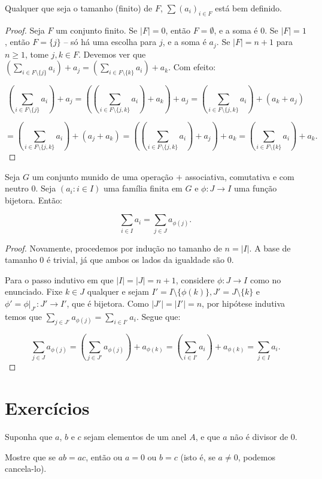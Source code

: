 \begin{lemma}
Qualquer que seja o tamanho (finito) de $F$, $\sum(a_i)_{i\in F}$ está bem definido.
\end{lemma}

\begin{proof}
    Seja $F$ um conjunto finito.
Se $|F|=0$, então $F=\emptyset$, e a soma é $0$.
Se $|F|=1$, então $F=\{j\}$ -- só há uma escolha para $j$, e a soma é $a_j$.
    Se $|F|=n+1$ para $n\geq 1$, tome $j, k \in F$.
    Devemos ver que $\left(\sum_{i\in F\setminus\{j\}} a_i\right)+a_j=\left(\sum_{i\in F\setminus\{k\}} a_i\right)+a_k$.
    Com efeito:

    \[\left(\sum_{i\in F\setminus\{j\}} a_i\right)+a_j=\left(\left(\sum_{i\in F\setminus\{j, k\}} a_i\right)+a_k\right)+a_j=\left(\sum_{i\in F\setminus\{j, k\}} a_i\right)+(a_k+a_j)\]

    \[=\left(\sum_{i\in F\setminus\{j, k\}} a_i\right)+(a_j+a_k)=\left(\left(\sum_{i\in F\setminus\{j, k\}} a_i\right)+a_j\right)+a_k=\left(\sum_{i\in F\setminus\{k\}} a_i\right)+a_k.\]
\end{proof}

\begin{prop}
    Seja $G$ um conjunto munido de uma operação $+$ associativa, comutativa e com neutro $0$.
Seja $(a_i: i \in I)$ uma família finita em $G$ e $\phi:J\rightarrow I$ uma função bijetora.
Então:

    \[\sum_{i \in I}a_i=\sum_{j \in J}a_{\phi(j)}.\]

\end{prop}
\begin{proof}
Novamente, procedemos por indução no tamanho de $n=|I|$.
A base de tamanho $0$ é trivial, já que ambos os lados da igualdade são $0$.

Para o passo indutivo em que $|I|=|J|=n+1$, considere $\phi:J\rightarrow I$ como no enunciado.
Fixe $k \in J$ qualquer e sejam $I'=I\setminus\{\phi(k)\}, J'=J\setminus\{k\}$ e $\phi'=\phi|_{J'}:J'\rightarrow I'$, que é bijetora.
Como $|J'|=|I'|=n$, por hipótese indutiva temos que $\sum_{j \in J'}a_{\phi(j)}=\sum_{i \in I'}a_i$.
Segue que:

\[\sum_{j \in J}a_{\phi(j)}=\left(\sum_{j \in J'}a_{\phi(j)}\right)+a_{\phi(k)}=\left(\sum_{i \in I'}a_{i}\right)+a_{\phi(k)}=\sum_{j \in I}a_{i}.\]
\end{proof}

\section{Exercícios}
\begin{exer}
    Suponha que $a$, $b$ e $c$ sejam elementos de um anel $A$, e que $a$ não é divisor de $0$.
    
    Mostre que se $ab = ac$, então ou $a = 0$ ou $b = c$ (isto é, se $a\neq 0$, podemos cancela-lo).
\end{exer}